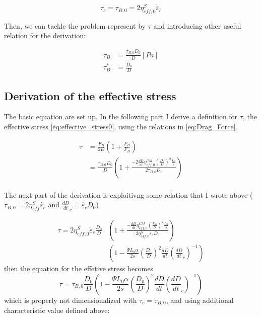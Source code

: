 \documentclass{article}
\begin{document}
\begin{equation}
    \tau_c = \tau_{B,0} = 2\eta^S_{eff,0}\dot{\varepsilon}_c
    \label{eq:tau_B_0_eq0}
\end{equation}



Then, we can tackle the problem represent by $\tau$ and introducing other useful relation for the derivation: 

\begin{align}
    \tau_B &= \frac{\tau_{B,0}D_0}{D} [Pa] \\
    \tau_B^{*}&= \frac{D_0}{D} 
\end{align}
\subsection{Derivation of the effective stress}
The basic equation are set up. In the following part I derive a definition for $\tau$, the effective stress \eqref{eq:effective_stress0}, using the relations in \eqref{eq:Drag_Force}.

\begin{align}
\tau &= \frac{F_B}{2D}\left(1+\frac{F_D}{F_B}\right)\\
&= \frac{\tau_{B,0} D_0}{D}\left(1+\frac{-2\frac{dD}{dt}\eta^{UM}_{eff,0}\left(\frac{D_0}{D}\right)^2\frac{L_0}{s}}{2 \tau_{B,0}D_0}\right)\\
\label{eq:effective_stress1}
\end{align}

The next part of the derivation is exploitivng some relation that I wrote above ($\tau_{B,0}=2\eta^S_{eff}\dot{\varepsilon_c}$ and $\frac{dD}{dt}_c = \dot{\varepsilon_c}D_0$)

\begin{align}
   \tau = 2\eta^S_{eff,0}\dot{\varepsilon}_c\frac{ D_0}{D} &\left(1+\frac{-\frac{dD}{dt}\eta^{UM}_{eff,0}\left(\frac{D_0}{D}\right)^2\frac{L_0}{s}}{2\eta^S_{eff,0}\dot{\varepsilon}_c D_0}\right)\\
   &\left( 1-\frac{\Psi L_0 \alpha}{2 s}\left(\frac{D_0}{D}\right)^2 \frac{dD}{dt}\left(\frac{dD}{dt}_c\right)^{-1}\right)
\end{align}
then the equation for the effetive stress becomes
\begin{equation}
    \tau = \tau_{B,0} \frac{D_0}{D} \left( 1-\frac{\Psi L_0 \alpha}{2 s}\left(\frac{D_0}{D}\right)^2 \frac{dD}{dt}\left(\frac{dD}{dt}_c\right)^{-1}\right)
\end{equation}
which is properly not dimensionalized with $\tau_c = \tau_{B,0}$, and using additional characteristic value defined above: 
\end{document}
